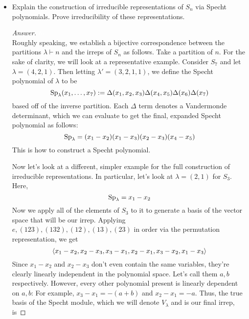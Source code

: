 \documentclass[../notes.tex]{subfiles}
\begin{document}
\begin{itemize}
\begin{proof}[Answer]
\begin{align*}
        \end{align*}
        Thus, since $\bar{\Z}$ is a ring, $|G|/d_V\in\bar{\Z}$. Naturally, it is also in $\Q$. It follows that it is in $\Q\cap\bar{\Z}=\Z$. Note that this last equality holds via a somewhat complicated polynomial argument with prime divisors and such. Regardless, since $|G|/d_V$ is an integer, this means that $d_V\mid|G|$, as desired.
    \end{proof}
    \item Explain the construction of irreducible representations of $S_n$ via Specht polynomials. Prove irreducibility of these representations.
    \begin{proof}[Answer]
        ${\color{white}hi}$\\
        Roughly speaking, we establish a bijective correspondence between the partitions $\lambda\vdash n$ and the irreps of $S_n$ as follows. Take a partition of $n$. For the sake of clarity, we will look at a representative example. Consider $S_7$ and let $\lambda=(4,2,1)$. Then letting $\lambda'=(3,2,1,1)$, we define the Specht polynomial of $\lambda$ to be
        \begin{equation*}
            \operatorname{Sp}_\lambda(x_1,\dots,x_7) := \Delta(x_1,x_2,x_3)\Delta(x_4,x_5)\Delta(x_6)\Delta(x_7)
        \end{equation*}
        based off of the inverse partition. Each $\Delta$ term denotes a Vandermonde determinant, which we can evaluate to get the final, expanded Specht polynomial as follows:
        \begin{equation*}
            \operatorname{Sp}_\lambda = (x_1-x_2)(x_1-x_3)(x_2-x_3)(x_4-x_5)
        \end{equation*}
        This is how to construct a Specht polynomial.\par
        Now let's look at a different, simpler example for the full construction of irreducible representations. In particular, let's look at $\lambda=(2,1)$ for $S_3$. Here,
        \begin{equation*}
            \operatorname{Sp}_\lambda = x_1-x_2
        \end{equation*}
        Now we apply all of the elements of $S_3$ to it to generate a basis of the vector space that will be our irrep. Applying $e,(123),(132),(12),(13),(23)$ in order via the permutation representation, we get
        \begin{equation*}
            \left\langle{x_1-x_2,x_2-x_3,x_3-x_1,x_2-x_1,x_3-x_2,x_1-x_3}\right\rangle
        \end{equation*}
        Since $x_1-x_2$ and $x_2-x_3$ don't even contain the same variables, they're clearly linearly independent in the polynomial space. Let's call them $a,b$ respectively. However, every other polynomial present is linearly dependent on $a,b$: For example, $x_3-x_1=-(a+b)$ and $x_2-x_1=-a$. Thus, the true basis of the Specht module, which we will denote $V_\lambda$ and is our final irrep, is

\end{proof}
\end{itemize}
\end{document}
